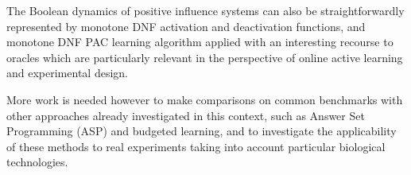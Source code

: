 \documentclass{llncs}
\begin{document}
The Boolean dynamics of positive influence systems can also be straightforwardly represented by monotone DNF activation and deactivation functions,
and monotone DNF PAC learning algorithm applied with an interesting recourse to oracles 
which are particularly relevant in the perspective of online active learning and experimental design.

More work is needed however to make comparisons on common benchmarks
with  other approaches already investigated in this context, such as Answer Set Programming (ASP) and budgeted learning,
and to investigate the applicability of these methods to real experiments taking into account particular biological technologies.



\end{document}
